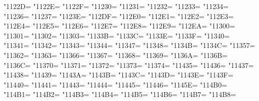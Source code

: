 \XeTeXcharclass"1122D=\KclassCM
\XeTeXcharclass"1122E=\KclassCM
\XeTeXcharclass"1122F=\KclassCM
\XeTeXcharclass"11230=\KclassCM
\XeTeXcharclass"11231=\KclassCM
\XeTeXcharclass"11232=\KclassCM
\XeTeXcharclass"11233=\KclassCM
\XeTeXcharclass"11234=\KclassCM
\XeTeXcharclass"11236=\KclassCM
\XeTeXcharclass"11237=\KclassCM
\XeTeXcharclass"1123E=\KclassCM
\XeTeXcharclass"112DF=\KclassCM
\XeTeXcharclass"112E0=\KclassCM
\XeTeXcharclass"112E1=\KclassCM
\XeTeXcharclass"112E2=\KclassCM
\XeTeXcharclass"112E3=\KclassCM
\XeTeXcharclass"112E4=\KclassCM
\XeTeXcharclass"112E5=\KclassCM
\XeTeXcharclass"112E6=\KclassCM
\XeTeXcharclass"112E7=\KclassCM
\XeTeXcharclass"112E8=\KclassCM
\XeTeXcharclass"112E9=\KclassCM
\XeTeXcharclass"112EA=\KclassCM
\XeTeXcharclass"11300=\KclassCM
\XeTeXcharclass"11301=\KclassCM
\XeTeXcharclass"11302=\KclassCM
\XeTeXcharclass"11303=\KclassCM
\XeTeXcharclass"1133B=\KclassCM
\XeTeXcharclass"1133C=\KclassCM
\XeTeXcharclass"1133E=\KclassCM
\XeTeXcharclass"1133F=\KclassCM
\XeTeXcharclass"11340=\KclassCM
\XeTeXcharclass"11341=\KclassCM
\XeTeXcharclass"11342=\KclassCM
\XeTeXcharclass"11343=\KclassCM
\XeTeXcharclass"11344=\KclassCM
\XeTeXcharclass"11347=\KclassCM
\XeTeXcharclass"11348=\KclassCM
\XeTeXcharclass"1134B=\KclassCM
\XeTeXcharclass"1134C=\KclassCM
\XeTeXcharclass"11357=\KclassCM
\XeTeXcharclass"11362=\KclassCM
\XeTeXcharclass"11363=\KclassCM
\XeTeXcharclass"11366=\KclassCM
\XeTeXcharclass"11367=\KclassCM
\XeTeXcharclass"11368=\KclassCM
\XeTeXcharclass"11369=\KclassCM
\XeTeXcharclass"1136A=\KclassCM
\XeTeXcharclass"1136B=\KclassCM
\XeTeXcharclass"1136C=\KclassCM
\XeTeXcharclass"11370=\KclassCM
\XeTeXcharclass"11371=\KclassCM
\XeTeXcharclass"11372=\KclassCM
\XeTeXcharclass"11373=\KclassCM
\XeTeXcharclass"11374=\KclassCM
\XeTeXcharclass"11435=\KclassCM
\XeTeXcharclass"11436=\KclassCM
\XeTeXcharclass"11437=\KclassCM
\XeTeXcharclass"11438=\KclassCM
\XeTeXcharclass"11439=\KclassCM
\XeTeXcharclass"1143A=\KclassCM
\XeTeXcharclass"1143B=\KclassCM
\XeTeXcharclass"1143C=\KclassCM
\XeTeXcharclass"1143D=\KclassCM
\XeTeXcharclass"1143E=\KclassCM
\XeTeXcharclass"1143F=\KclassCM
\XeTeXcharclass"11440=\KclassCM
\XeTeXcharclass"11441=\KclassCM
\XeTeXcharclass"11443=\KclassCM
\XeTeXcharclass"11444=\KclassCM
\XeTeXcharclass"11445=\KclassCM
\XeTeXcharclass"11446=\KclassCM
\XeTeXcharclass"1145E=\KclassCM
\XeTeXcharclass"114B0=\KclassCM
\XeTeXcharclass"114B1=\KclassCM
\XeTeXcharclass"114B2=\KclassCM
\XeTeXcharclass"114B3=\KclassCM
\XeTeXcharclass"114B4=\KclassCM
\XeTeXcharclass"114B5=\KclassCM
\XeTeXcharclass"114B6=\KclassCM
\XeTeXcharclass"114B7=\KclassCM
\XeTeXcharclass"114B8=\KclassCM
